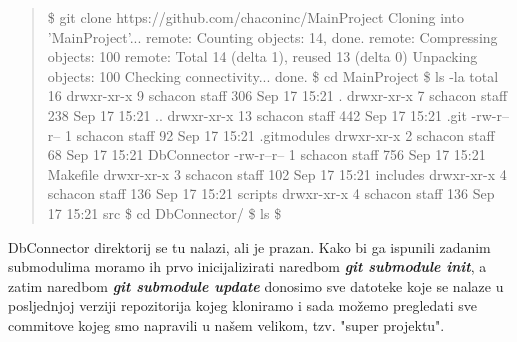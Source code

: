 \documentclass {article}
\begin{document}
\begin{enumerate}
\begin{enumerate}
    \begin{quote}
        \$ git clone https://github.com/chaconinc/MainProject
    \newline Cloning into 'MainProject'...
    \newline remote: Counting objects: 14, done.
    \newline remote: Compressing objects: 100%
    \newline remote: Total 14 (delta 1), reused 13 (delta 0)
    \newline Unpacking objects: 100%
    \newline Checking connectivity... done.
    \newline \$ cd MainProject
    \newline \$ ls -la
    \newline total 16
    \newline drwxr-xr-x   9 schacon  staff  306 Sep 17 15:21 .
    \newline drwxr-xr-x   7 schacon  staff  238 Sep 17 15:21 ..
    \newline drwxr-xr-x  13 schacon  staff  442 Sep 17 15:21 .git
    \newline -rw-r--r--   1 schacon  staff   92 Sep 17 15:21 .gitmodules
    \newline drwxr-xr-x   2 schacon  staff   68 Sep 17 15:21 DbConnector
    \newline -rw-r--r--   1 schacon  staff  756 Sep 17 15:21 Makefile
    \newline drwxr-xr-x   3 schacon  staff  102 Sep 17 15:21 includes
    \newline drwxr-xr-x   4 schacon  staff  136 Sep 17 15:21 scripts
    \newline drwxr-xr-x   4 schacon  staff  136 Sep 17 15:21 src
    \newline \$ cd DbConnector/
    \newline \$ ls
    \newline \$
    \end{quote}

DbConnector direktorij se tu nalazi, ali je prazan. Kako bi ga ispunili zadanim submodulima moramo ih prvo inicijalizirati naredbom \textbf{\emph{git submodule init}}, a zatim naredbom \textbf{\emph{git submodule update}} donosimo sve datoteke koje se nalaze u posljednjoj verziji repozitorija kojeg kloniramo i sada možemo pregledati sve commitove kojeg smo napravili u našem velikom, tzv. "super projektu".


\end{enumerate}
\end{enumerate}
\end{document}
